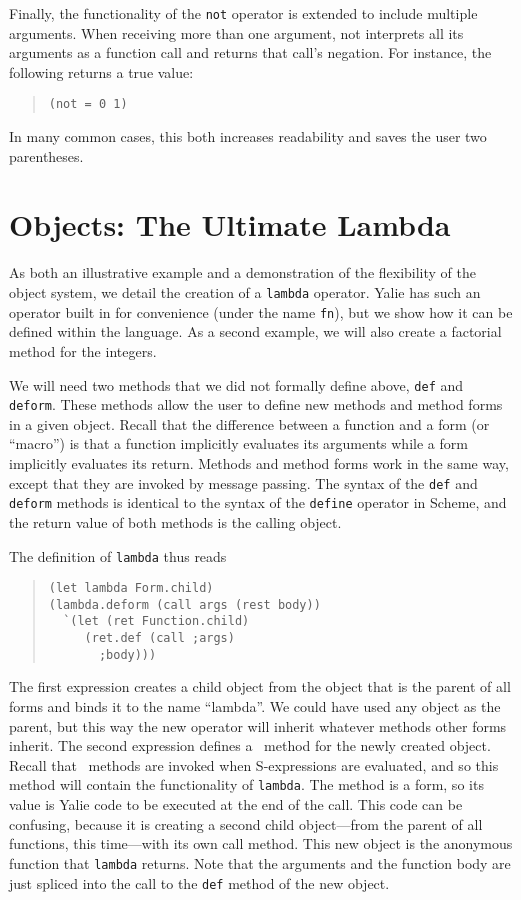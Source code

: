 \documentclass[twocolumn]{article}
\begin{document}
Finally, the functionality of the \texttt{not} operator is extended to
include multiple arguments. When receiving more than one argument, not
interprets all its arguments as a function call and returns that
call's negation. For instance, the following returns a true value:
\begin{quote}
\begin{verbatim}
(not = 0 1)
\end{verbatim}
\end{quote}
In many common cases, this both increases readability and saves the
user two parentheses.

\section*{Objects: The Ultimate Lambda}
As both an illustrative example and a demonstration of the flexibility
of the object system, we detail the creation of a \texttt{lambda}
operator. Yalie has such an operator built in for convenience (under
the name \texttt{fn}), but we show how it can be defined within the
language. As a second example, we will also create a factorial method
for the integers.

We will need two methods that we did not formally define above,
\texttt{def} and \texttt{deform}. These methods allow the user to
define new methods and method forms in a given object. Recall that the
difference between a function and a form (or ``macro'') is that a
function implicitly evaluates its arguments while a form implicitly
evaluates its return. Methods and method forms work in the same way,
except that they are invoked by message passing. The syntax of the
\texttt{def} and \texttt{deform} methods is identical to the syntax of
the \texttt{define} operator in Scheme, and the return value of both
methods is the calling object.

The definition of \texttt{lambda} thus reads
\begin{quote}
\begin{verbatim}
(let lambda Form.child)
(lambda.deform (call args (rest body))
  `(let (ret Function.child)
     (ret.def (call ;args)
       ;body)))
\end{verbatim}
\end{quote}
The first expression creates a child object from the object that is
the parent of all forms and binds it to the name ``lambda''. We could
have used any object as the parent, but this way the new operator will
inherit whatever methods other forms inherit. The second expression
defines a \call\ method for the newly created object. Recall that
\call\ methods are invoked when S-expressions are evaluated, and so
this method will contain the functionality of \texttt{lambda}. The
method is a form, so its value is Yalie code to be executed at the end
of the call. This code can be confusing, because it is creating a
second child object---from the parent of all functions, this
time---with its own call method. This new object is the anonymous
function that \texttt{lambda} returns. Note that the arguments and the
function body are just spliced into the call to the \texttt{def}
method of the new object.
\end{document}

